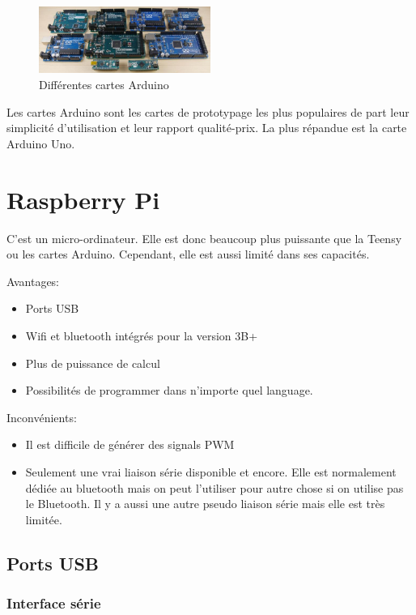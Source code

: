 \documentclass[a4paper, 11pt]{report}
\begin{document}
\begin{figure}[h!]
\begin{centering}
\includegraphics[width=0.5\textwidth]{images/cartesArduino.jpg}
\caption{Différentes cartes Arduino}
\par\end{centering}
\end{figure}

Les cartes Arduino sont les cartes de prototypage les plus populaires de part leur simplicité d'utilisation et leur rapport qualité-prix. La plus répandue est la carte Arduino Uno.

\section{Raspberry Pi}
C'est un micro-ordinateur. Elle est donc beaucoup plus puissante que la Teensy ou les cartes Arduino. Cependant, elle est aussi limité dans ses capacités.

Avantages:
\begin{itemize}
\item Ports USB
\item Wifi et bluetooth intégrés pour la version 3B+
\item Plus de puissance de calcul
\item Possibilités de programmer dans n'importe quel language.
\end{itemize}

Inconvénients:
\begin{itemize}
\item Il est difficile de générer des signals PWM
\item Seulement une vrai liaison série disponible et encore. Elle est normalement dédiée au bluetooth mais on peut l'utiliser pour autre chose si on utilise pas le Bluetooth. Il y a aussi une autre pseudo liaison série mais elle est très limitée.
\end{itemize}

\subsection{Ports USB}

\subsubsection{Interface série}
\end{document}
